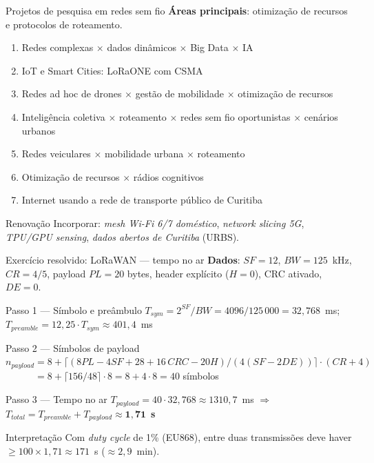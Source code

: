 \documentclass[aspectratio=169,11pt]{beamer}
\begin{document}
\begin{frame}{Projetos de pesquisa em redes sem fio}
  \textbf{Áreas principais}: otimização de recursos e protocolos de roteamento.
  \begin{enumerate}
    \item Redes complexas $\times$ dados dinâmicos $\times$ Big Data $\times$ IA
    \item IoT e Smart Cities: LoRaONE com CSMA
    \item Redes ad hoc de drones $\times$ gestão de mobilidade $\times$ otimização de recursos
    \item Inteligência coletiva $\times$ roteamento $\times$ redes sem fio oportunistas $\times$ cenários urbanos
    \item Redes veiculares $\times$ mobilidade urbana $\times$ roteamento
    \item Otimização de recursos $\times$ rádios cognitivos
    \item Internet usando a rede de transporte público de Curitiba
  \end{enumerate}
  \begin{exampleblock}{Renovação}
    Incorporar: \emph{mesh Wi-Fi 6/7 doméstico}, \emph{network slicing 5G}, \emph{TPU/GPU sensing}, \emph{dados abertos de Curitiba} (URBS).
  \end{exampleblock}
\end{frame}

\begin{frame}{Exercício resolvido: LoRaWAN --- tempo no ar}
  \small
  \textbf{Dados}: $SF=12$, $BW=125$~kHz, $CR=4/5$, payload $PL=20$ bytes, header explícito ($H=0$), CRC ativado, $DE=0$.
  \begin{block}{Passo 1 --- Símbolo e preâmbulo}
    $T_{sym}=2^{SF}/BW=4096/125\,000=32{,}768$~ms; \quad $T_{preamble}=12{,}25\cdot T_{sym}\approx 401{,}4$~ms
  \end{block}
  \pause
  \begin{block}{Passo 2 --- Símbolos de payload}
    $n_{payload}=8+\big\lceil(8PL-4SF+28+16\,CRC-20H)/(4(SF-2DE))\big\rceil\cdot(CR+4)$\\
    $\phantom{n_{payload}}=8+\lceil 156/48\rceil\cdot 8=8+4\cdot 8=40$ símbolos
  \end{block}
  \pause
  \begin{block}{Passo 3 --- Tempo no ar}
    $T_{payload}=40\cdot 32{,}768\approx 1310{,}7$~ms \quad $\Rightarrow$ \quad $T_{total}=T_{preamble}+T_{payload}\approx \mathbf{1{,}71}$~\textbf{s}
  \end{block}
  \pause
  \begin{alertblock}{Interpretação}
    Com \emph{duty cycle} de 1\% (EU868), entre duas transmissões deve haver $\geq 100\times 1{,}71\approx 171$~s ($\approx 2{,}9$~min).
  \end{alertblock}
\end{frame}
\end{document}
